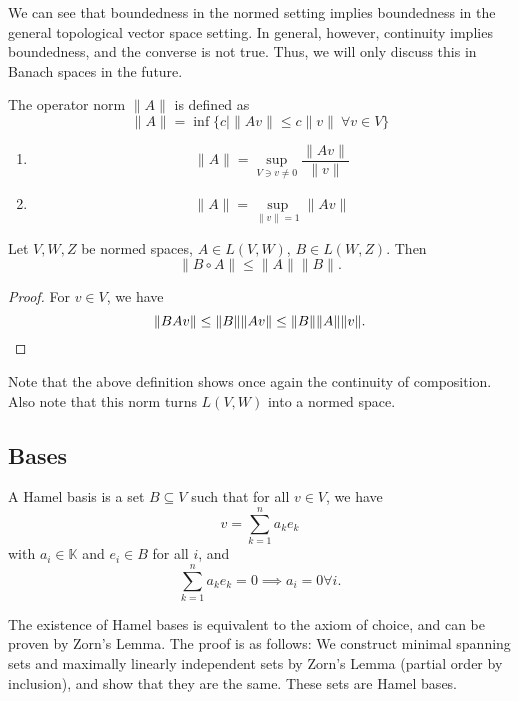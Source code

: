 \documentclass[twoside,symmetric, openany, 12pt]{./tuftebook}
\theoremstyle{definition}
\theoremstyle{definition}
\theoremstyle{definition}
\newenvironment{parts}{\begin{enumerate}[label=(\alph*)]}{\end{enumerate}}
\begin{document}
We can see that boundedness in the normed setting implies boundedness in the general topological vector space setting. In general, however, continuity implies boundedness, and the converse is not true. Thus, we will only discuss this in Banach spaces in the future. 
	\begin{Definition}
		The operator norm $\|A\|$ is defined as
		\[\|A\|=\inf \{c| \|Av\| \le c\|v\|~\forall v\in V\}\]
	\end{Definition}
	\begin{Corollary}\noindent
		\begin{parts}
			\item \[\|A\|=\sup_{V\ni v \neq 0}\frac{\|Av\|}{\|v\|}\]
			\item \[\|A\| = \sup_{\|v\|=1}\|A v\|\]
		\end{parts}
	\end{Corollary}
	\begin{Theorem}
		Let $V,W, Z$ be normed spaces, $A\in L(V,W)$, $B\in L(W,Z)$. Then
		\[\|B\circ A\| \le \|A\| \|B\|.\]
	\end{Theorem}
\begin{proof}
	For $v\in V$, we have
	\[\|BAv\|\le \|B\| \|Av\| \le \|B\| \|A\| \|v\|.\qedhere\]
\end{proof}
Note that the above definition shows once again the continuity of composition. Also note that this norm turns $L(V,W)$ into a normed space.
	\subsection{Bases}
	\begin{Definition}
		A Hamel basis is a set $B\subseteq V$ such that for all $v\in V$, we have
		\[v=\sum_{k=1}^n a_k e_k\]
		with $a_i\in \mathbb{K}$ and $e_i\in B$ for all $i$, and
		\[\sum_{k=1}^n a_k e_k=0\implies a_i=0\forall i.\]
	\end{Definition}
	The existence of Hamel bases is equivalent to the axiom of choice, and can be proven by Zorn's Lemma. The proof is as follows: We construct minimal spanning sets and maximally linearly independent sets by Zorn's Lemma (partial order by inclusion), and show that they are the same. These sets are Hamel bases.
	
\end{document}
